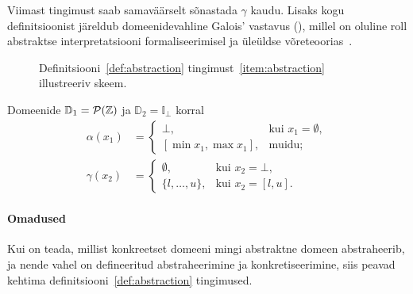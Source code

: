 \documentclass[../thesis.tex]{subfiles}
\begin{document}
Viimast tingimust saab samaväärselt sõnastada $\gamma$ kaudu. Lisaks kogu definitsioonist järeldub domeenidevahline Galois' vastavus (), millel on oluline roll abstraktse interpretatsiooni formaliseerimisel ja üleüldse võreteoorias~\cite{cousot77}.

\begin{figure}
	\centering
	\caption{Definitsiooni~\ref{def:abstraction} tingimust~\ref{item:abstraction} illustreeriv skeem.}
	\label{fig:abstraction}
\end{figure}

Domeenide $\mathbb{D}_1 = \mathcal{P}(\mathbb{Z})$ ja $\mathbb{D}_2 = \mathbb{I}_\bot$ korral~\cite[243]{cousot77}
\begin{align*}
	\alpha(x_1) &= \begin{cases}
		\bot, & \text{kui } x_1 = \emptyset, \\
		[\min x_1, \max x_1], & \text{muidu};
	\end{cases} \\
	\gamma(x_2) &= \begin{cases}
		\emptyset, & \text{kui } x_2 = \bot, \\
		\{l, \ldots, u\}, & \text{kui } x_2 = [l, u].
	\end{cases}
\end{align*}

\paragraph{Omadused}
Kui on teada, millist konkreetset domeeni mingi abstraktne domeen abstraheerib, ja nende vahel on defineeritud abstraheerimine ja konkretiseerimine, siis peavad kehtima definitsiooni~\ref{def:abstraction} tingimused.
\end{document}
